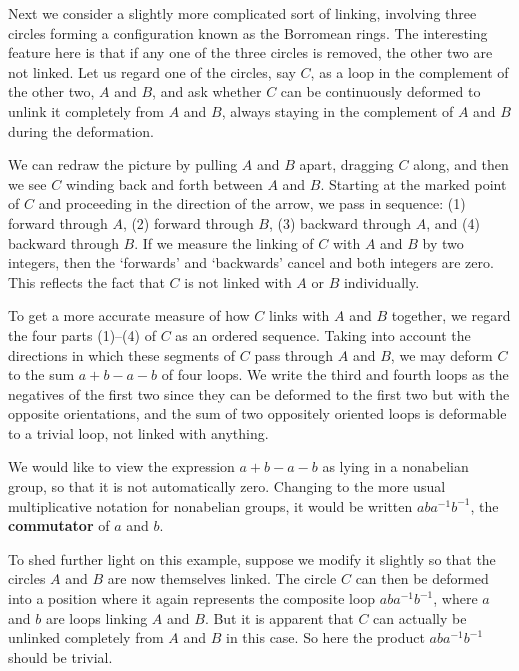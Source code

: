 \begin{example}
\label{ex:borromean-rings-commutator}
Next we consider a slightly more complicated sort of linking, involving three
circles forming a configuration known as the Borromean rings. The interesting
feature here is that if any one of the three circles is removed, the other two are not
linked. Let us regard one of the circles, say $C$, as a loop in the complement of the
other two, $A$ and $B$, and ask whether $C$ can be continuously deformed to unlink it
completely from $A$ and $B$, always staying in the complement of $A$ and $B$ during the
deformation.



We can redraw the picture by pulling $A$ and $B$ apart, dragging $C$ along, and then we
see $C$ winding back and forth between $A$ and $B$. Starting at the marked point of $C$
and proceeding in the direction of the arrow, we pass in sequence: (1) forward
through $A$, (2) forward through $B$, (3) backward through $A$, and (4) backward
through $B$. If we measure the linking of $C$ with $A$ and $B$ by two integers, then the
`forwards' and `backwards' cancel and both integers are zero. This reflects the fact
that $C$ is not linked with $A$ or $B$ individually.

To get a more accurate measure of how $C$ links with $A$ and $B$ together, we regard
the four parts (1)--(4) of $C$ as an ordered sequence. Taking into account the
directions in which these segments of $C$ pass through $A$ and $B$, we may deform $C$
to the sum $a+b-a-b$ of four loops. We write the third and fourth loops as the
negatives of the first two since they can be deformed to the first two but with the
opposite orientations, and the sum of two oppositely oriented loops is deformable to
a trivial loop, not linked with anything.



We would like to view the expression $a+b-a-b$ as lying in a nonabelian group, so
that it is not automatically zero. Changing to the more usual multiplicative notation
for nonabelian groups, it would be written $aba^{-1}b^{-1}$, the \textbf{commutator} of $a$ and $b$.

To shed further light on this example, suppose we modify it slightly so that the
circles $A$ and $B$ are now themselves linked. The circle $C$ can then be deformed into a
position where it again represents the composite loop $aba^{-1}b^{-1}$, where $a$ and $b$ are
loops linking $A$ and $B$. But it is apparent that $C$ can actually be unlinked completely
from $A$ and $B$ in this case. So here the product $aba^{-1}b^{-1}$ should be trivial.


\end{example}

